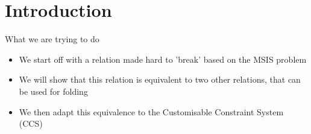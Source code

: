 \section{Introduction}
\begin{frame}{What we are trying to do}
    \begin{itemize}
        \item We start off with a relation made hard to 'break' based on the MSIS problem
        \item We will show that this relation is equivalent to two other relations, that can be used for folding
        \item We then adapt this equivalence to the Customisable Constraint System (CCS)
    \end{itemize}
\end{frame}
